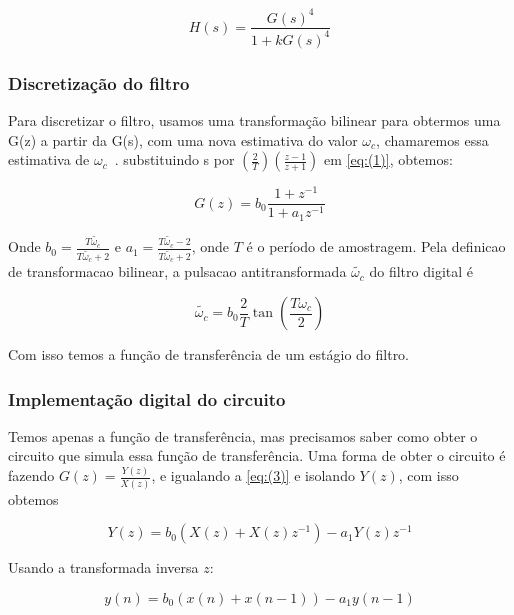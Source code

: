 \documentclass{article}
\begin{document}
\begin{equation}\label{eq:(2)}
 H(s) = \frac{G(s)^4}{1+k G(s)^4} 
\end{equation}

\subsubsection{Discretização do filtro}

Para discretizar o filtro, usamos uma transformação bilinear para obtermos uma G(z) a partir da G(s), 
com uma nova estimativa do valor $\omega_c$, chamaremos essa estimativa de $\omega_c$~.
substituindo s por $(\frac{2}{T})(\frac{z-1}{z+1})$ em \ref{eq:(1)}, obtemos:

\begin{equation}\label{eq:(3)}
G(z) = b_0 \frac{1+z^{-1}}{1+a_1 z^{-1}}  
\end{equation}


Onde $b_0 = \frac{T \tilde{\omega_c}}{T \tilde{\omega_c}+2}$ e $a_1 = \frac{T \tilde{\omega_c} -2}{T\tilde{\omega_c} +2}$, onde $T$ é o período de amostragem.
Pela definicao de transformacao bilinear, a pulsacao antitransformada $\tilde{\omega_c}$ do filtro digital é

\begin{equation}\label{eq:(4)}
\tilde{\omega_c} = b_0 \frac{2}{T} \tan({\frac{T \omega_c}{2}} ) 
\end{equation}

Com isso temos a função de transferência de um estágio do filtro.

\subsubsection{Implementação digital do circuito}

Temos apenas a função de transferência, mas precisamos saber como obter o circuito que simula essa função de transferência.
Uma forma de obter o circuito é fazendo $G(z) = \frac{Y(z)}{X(z)}$, e igualando a \ref{eq:(3)} e isolando $Y(z)$, com isso obtemos


\begin{equation}\label{eq:(5)}
Y(z) = b_0(X(z)+X(z)z^{-1})-a_1Y(z)z^{-1}
\end{equation}

Usando a transformada inversa $z$:

\begin{equation}\label{eq:(6)}
y(n)=b_0(x(n)+x(n-1))-a_1 y(n-1)  
\end{equation}
\end{document}

